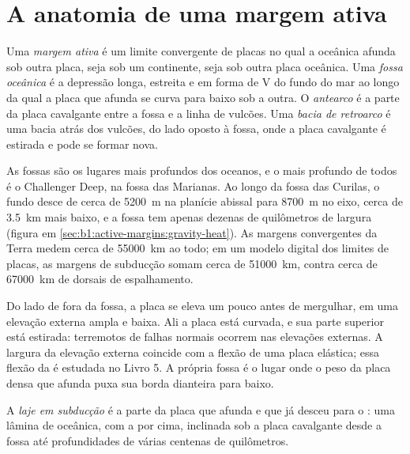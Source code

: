 \section{A anatomia de uma margem ativa}\label{sec:b1:active-margins:anatomy}

\begin{definition}\label{def:b1:active-margins:active-margin}
Uma \emph{margem ativa} é um limite convergente de placas no qual a  oceânica afunda sob outra placa, seja sob um continente, seja sob outra placa oceânica. Uma \emph{fossa oceânica} é a depressão longa, estreita e em forma de V do fundo do mar ao longo da qual a placa que afunda se curva para baixo sob a outra. O \emph{antearco} é a parte da placa cavalgante entre a fossa e a linha de vulcões. Uma \emph{bacia de retroarco} é uma bacia atrás dos vulcões, do lado oposto à fossa, onde a placa cavalgante é estirada e pode se formar  nova.
\end{definition}

As fossas são os lugares mais profundos dos oceanos, e o mais profundo de todos é o Challenger Deep, na fossa das Marianas. Ao longo da fossa das Curilas, o fundo desce de cerca de \qty{5200}{m} na planície abissal para \qty{8700}{m} no eixo, cerca de \qty{3.5}{km} mais baixo, e a fossa tem apenas dezenas de quilômetros de largura (figura em \cref{sec:b1:active-margins:gravity-heat}). As margens convergentes da Terra medem cerca de \qty{55000}{km} ao todo; em um modelo digital dos limites de placas, as margens de subducção somam cerca de \qty{51000}{km}, contra cerca de \qty{67000}{km} de dorsais de espalhamento.

Do lado de fora da fossa, a placa se eleva um pouco antes de mergulhar, em uma elevação externa ampla e baixa. Ali a placa está curvada, e sua parte superior está estirada: terremotos de falhas normais ocorrem nas elevações externas. A largura da elevação externa coincide com a flexão de uma placa elástica; essa flexão da  é estudada no Livro 5. A própria fossa é o lugar onde o peso da placa densa que afunda puxa sua borda dianteira para baixo.

\begin{definition}\label{def:b1:active-margins:slab}
A \emph{laje em subducção} é a parte da placa que afunda e que já desceu para o : uma lâmina de  oceânica, com a  por cima, inclinada sob a placa cavalgante desde a fossa até profundidades de várias centenas de quilômetros.
\end{definition}

